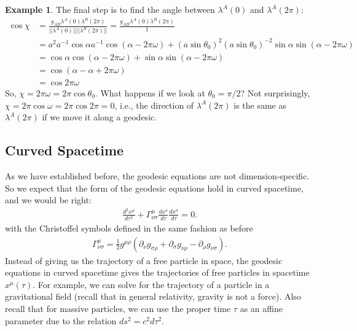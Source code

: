 \documentclass{article}
\theoremstyle{definition}
\newtheorem{exmp}{Example}[section]
\begin{document}
\begin{exmp}
	The final step is to find the angle between $\lambda^A(0)$ and $\lambda^A(2\pi)$:
	\begin{align*}
	\cos\chi &= \frac{g_{AB}\lambda^A(0)\lambda^B(2\pi)}{\vert\vert \lambda^A(0)\vert\vert\vert\vert \lambda^B(2\pi)\vert\vert} = \frac{g_{AB}\lambda^A(0)\lambda^B(2\pi)}{1}\\
	&= a^2a^{-1}\cos\alpha a^{-1}\cos(\alpha-2\pi\omega) + (a\sin\theta_0)^2(a\sin\theta_0)^{-2}\sin\alpha\sin(\alpha-2\pi\omega)\\
	&= \cos\alpha\cos(\alpha-2\pi\omega) + \sin\alpha \sin(\alpha-2\pi\omega)\\
	&= \cos(\alpha-\alpha + 2\pi\omega)\\
	&= \cos 2\pi\omega
	\end{align*}
	So, ${\chi = 2\pi\omega = 2\pi\cos\theta_0}$. What happens if we look at $\theta_0 = \pi/2$? Not surprisingly, $\chi = 2\pi\cos\omega = 2\pi\cos 2\pi = 0$, i.e., the direction of $\lambda^A(2\pi)$ is the same as $\lambda^{A}(2\pi)$ if we move it along a geodesic. 
\end{exmp}


\subsection{Curved Spacetime}

As we have established before, the geodesic equations are not dimension-specific. So we expect that the form of the geodesic equations hold in curved spacetime, and we would be right:
\begin{align*}
\frac{d^2x^\mu}{d\tau^2} + \Gamma^{\mu}_{\nu\sigma}\frac{dx^\nu}{d\tau}\frac{dx^\sigma}{d\tau} = 0.
\end{align*}
with the Christoffel symbols defined in the same fashion as before
\begin{align*}
\Gamma^\mu_{\nu\sigma} = \frac{1}{2}g^{\mu\rho}\left(\partial_\nu g_{\sigma\rho} + \partial_{\sigma}g_{\nu\rho} - \partial_\rho g_{\nu\sigma} \right).
\end{align*}
Instead of giving us the trajectory of a free particle in space, the geodesic equations in curved spacetime gives the trajectories of free particles in spacetime $x^\mu(\tau)$. For example, we can solve for the trajectory of a particle in a gravitational field (recall that in general relativity, gravity is not a force). Also recall that for massive particles, we can use the proper time $\tau$ as an affine parameter due to the relation $ds^2 = c^2d\tau^2$.\\
\end{document}
